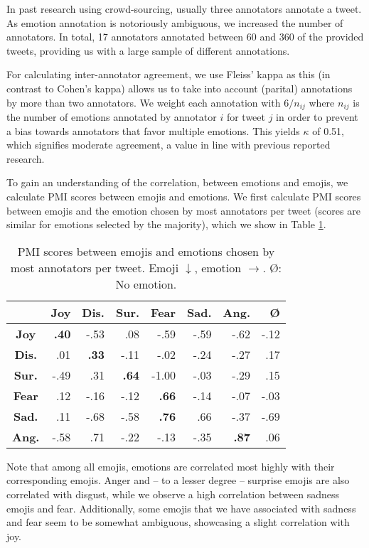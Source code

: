 \documentclass[10pt, a4paper]{article}
\begin{document}
In past research using crowd-sourcing, usually three annotators annotate a tweet. As emotion annotation is notoriously ambiguous, we increased the number of annotators. In total, 17 annotators annotated between 60 and 360 of the provided tweets, providing us with a large sample of different annotations.

For calculating inter-annotator agreement, we use Fleiss' kappa as this (in contrast to Cohen's kappa) allows us to take into account (parital) annotations by more than two annotators. We weight each annotation with $ 6 / n_{ij}$ where $n_{ij}$ is the number of emotions annotated by annotator $i$ for tweet $j$ in order to prevent a bias towards annotators that favor multiple emotions. This yields $\kappa$ of 0.51, which signifies moderate agreement, a value in line with previous reported research.

To gain an understanding of the correlation, between emotions and emojis, we calculate PMI scores between emojis and emotions. We first calculate PMI scores between emojis and the emotion chosen by most annotators per tweet (scores are similar for emotions selected by the majority), which we show in Table \ref{tab:pmi_results_top_emotions}.

\begin{table}
\centering
\begin{tabular}{c | r | r | r | r | r | r | r}
 & \textbf{Joy} & \textbf{Dis.} & \textbf{Sur.} & \textbf{Fear} & \textbf{Sad.} & \textbf{Ang.} & \textbf{\O} \\\hline
\textbf{Joy} & \textbf{.40} & -.53 & .08 & -.59 & -.59 & -.62 & -.12 \\
\textbf{Dis.} & .01 & \textbf{.33} & -.11 & -.02 & -.24 & -.27 & .17 \\
\textbf{Sur.} & -.49 & .31 & \textbf{.64} & -1.00 & -.03 & -.29 & .15 \\
\textbf{Fear} & .12 & -.16 & -.12 & \textbf{.66} & -.14 & -.07 & -.03 \\
\textbf{Sad.} & .11 & -.68 & -.58 & \textbf{.76} & .66 & -.37 & -.69 \\
\textbf{Ang.} & -.58 & .71 & -.22 & -.13 & -.35 & \textbf{.87} & .06
\end{tabular}
\caption{PMI scores between emojis and emotions chosen by most annotators per tweet. Emoji $\downarrow$, emotion $\rightarrow$. \O: No emotion.}
\label{tab:pmi_results_top_emotions}
\end{table}

Note that among all emojis, emotions are correlated most highly with their corresponding emojis. Anger and -- to a lesser degree -- surprise emojis are also correlated with disgust, while we observe a high correlation between sadness emojis and fear. Additionally, some emojis that we have associated with sadness and fear seem to be somewhat ambiguous, showcasing a slight correlation with joy.
\end{document}
